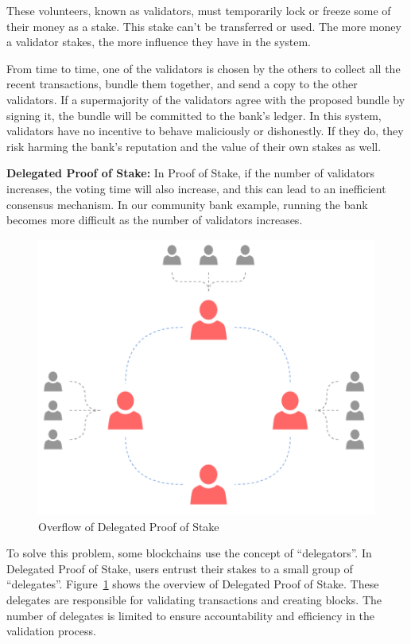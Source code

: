 \documentclass{novel}
\begin{document}
These volunteers, known as validators, must temporarily lock or freeze some of their money as a stake. This stake can’t be transferred or used. The more money a validator stakes, the more influence they have in the system.

From time to time, one of the validators is chosen by the others to collect all the recent transactions, bundle them together, and send a copy to the other validators. If a supermajority of the validators agree with the proposed bundle by signing it, the bundle will be committed to the bank’s ledger. In this system, validators have no incentive to behave maliciously or dishonestly. If they do, they risk harming the bank’s reputation and the value of their own stakes as well.

\textbf{Delegated Proof of Stake:} In Proof of Stake, if the number of validators increases, the voting time will also increase, and this can lead to an inefficient consensus mechanism. In our community bank example, running the bank becomes more difficult as the number of validators increases.
\begin{figure}[h]
	\centering
	\includegraphics[scale=0.5]{dpos.png}
	\caption{Overflow of Delegated Proof of Stake }
	\label{fig:dpos}
	\centering
\end{figure}

To solve this problem, some blockchains use the concept of “delegators”. In Delegated Proof of Stake, users entrust their stakes to a small group of “delegates”. Figure~\ref{fig:dpos} shows the overview of Delegated Proof of Stake. These delegates are responsible for validating transactions and creating blocks. The number of delegates is limited to ensure accountability and efficiency in the validation process.
\end{document}
